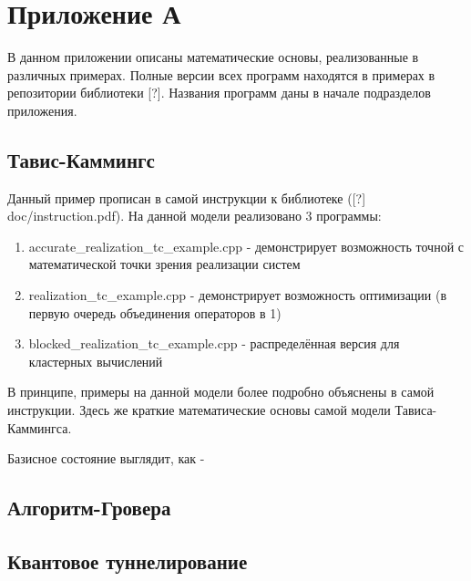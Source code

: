 \documentclass[aps,twocolumn,pra,showpacs,amsmath,amssymb,showkeys,10pt]{revtex4-2}
\begin{document}
    \section{Приложение А}

    В данном приложении описаны математические основы, реализованные в различных примерах. Полные версии всех программ находятся в примерах в репозитории библиотеки [?]. Названия программ даны в начале 
    подразделов приложения.

    \subsection{Тавис-Каммингс}
    Данный пример прописан в самой инструкции к библиотеке ([?] doc/instruction.pdf). На данной модели реализовано 3 программы: 
    \begin{enumerate} 
    \item accurate_realization_tc_example.cpp - демонстрирует возможность точной с математической точки зрения реализации систем
    \item realization_tc_example.cpp - демонстрирует возможность оптимизации (в первую очередь объединения операторов в 1)
    \item blocked_realization_tc_example.cpp - распределённая версия для кластерных вычислений
    \end{enumerate}

    В принципе, примеры на данной модели более подробно объяснены в самой инструкции. Здесь же краткие математические основы самой модели Тависа-Каммингса.

    Базисное состояние выглядит, как - 
    \subsection{Алгоритм-Гровера}
    \subsection{Квантовое туннелирование}
\end{document}
